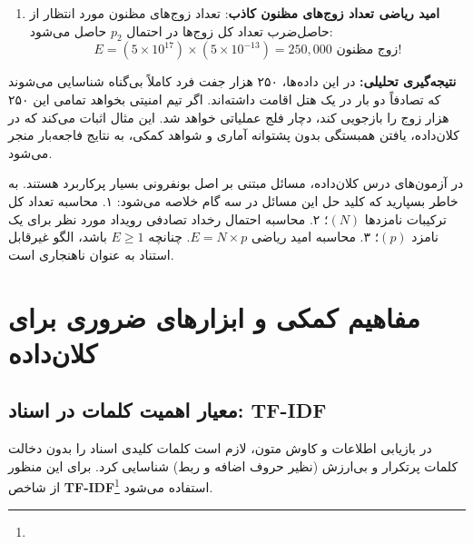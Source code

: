 \begin{example}
\begin{enumerate}
    \item \textbf{امید ریاضی تعداد زوج‌های مظنون کاذب}:
    تعداد زوج‌های مظنون مورد انتظار از حاصل‌ضرب تعداد کل زوج‌ها در احتمال $p_2$ حاصل می‌شود:
    \begin{equation}
    E = (5 \times 10^{17}) \times (5 \times 10^{-13}) = 250{,}000 \text{ زوج مظنون!}
    \end{equation}
\end{enumerate}
\textbf{نتیجه‌گیری تحلیلی:} در این داده‌ها، ۲۵۰ هزار جفت فرد کاملاً بی‌گناه شناسایی می‌شوند که تصادفاً دو بار در یک هتل اقامت داشته‌اند. اگر تیم امنیتی بخواهد تمامی این ۲۵۰ هزار زوج را بازجویی کند، دچار فلج عملیاتی خواهد شد. این مثال اثبات می‌کند که در کلان‌داده، یافتن همبستگی بدون پشتوانه آماری و شواهد کمکی، به نتایج فاجعه‌بار منجر می‌شود.
\end{example}

\begin{examnote}
در آزمون‌های درس کلان‌داده، مسائل مبتنی بر اصل بونفرونی بسیار پرکاربرد هستند. به خاطر بسپارید که کلید حل این مسائل در سه گام خلاصه می‌شود:
۱. محاسبه تعداد کل ترکیبات نامزدها $(N)$؛
۲. محاسبه احتمال رخداد تصادفی رویداد مورد نظر برای یک نامزد $(p)$؛
۳. محاسبه امید ریاضی $E = N \times p$. چنانچه $E \ge 1$ باشد، الگو غیرقابل استناد به عنوان ناهنجاری است.
\end{examnote}

\section{مفاهیم کمکی و ابزارهای ضروری برای کلان‌داده}

\subsection{معیار اهمیت کلمات در اسناد: TF-IDF}
در بازیابی اطلاعات و کاوش متون، لازم است کلمات کلیدی اسناد را بدون دخالت کلمات پرتکرار و بی‌ارزش (نظیر حروف اضافه و ربط) شناسایی کرد. برای این منظور از شاخص \textbf{TF-IDF}\footnote{} استفاده می‌شود.

